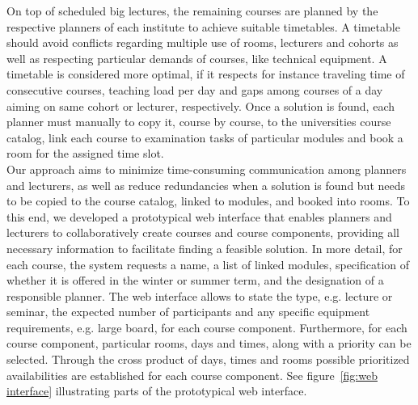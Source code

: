 \documentclass{easychair}
\begin{document}
  On top of scheduled big lectures, the remaining courses are planned by the respective planners of each institute to achieve suitable timetables. 
  A timetable should avoid conflicts regarding multiple use of rooms, lecturers and cohorts as well as respecting particular demands of courses, like technical equipment.
  A timetable is considered more optimal, if it respects for instance traveling time of consecutive courses, teaching load per day and gaps among courses of a day aiming on same cohort or lecturer, respectively. 
  Once a solution is found, each planner must manually to copy it, course by course, to the universities course catalog, link each course to examination tasks of particular modules and book a room for the assigned time slot. \\
  Our approach aims to minimize time-consuming communication among planners and lecturers, as well as reduce redundancies when a solution is found but needs to be copied to the course catalog, linked to modules, and booked into rooms.
  To this end, we developed a prototypical web interface that enables planners and lecturers to collaboratively create courses and course components, providing all necessary information to facilitate finding a feasible solution.
  In more detail, for each course, the system requests a name, a list of linked modules, specification of whether it is offered in the winter or summer term, and the designation of a responsible planner.
  The web interface allows to state the type, e.g. lecture or seminar, the expected number of participants and any specific equipment requirements, e.g. large board, for each course component.  
  Furthermore, for each course component, particular rooms, days and times, along with a priority can be selected.
  Through  the cross product of days, times and rooms possible prioritized availabilities are established for each course component. 
  See figure~\ref{fig:web interface} illustrating parts of the prototypical web interface. 
\end{document}
